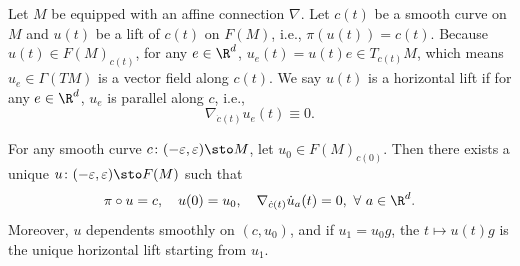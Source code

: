 Let $M$ be equipped with an affine connection $\nabla$. Let $c(t)$ be a smooth curve on $M$ and $u(t)$ be a lift of $c(t)$ on $F(M)$, i.e., $\pi(u(t)) = c(t)$. Because $u(t) \in F(M)_{c(t)}$, for any $e \in \R^d$, $u_e(t) = u(t)e \in T_{c(t)}M$, which means $u_e \in \Gamma(TM)$ is a vector field along $c(t)$. We say $u(t)$ is a horizontal lift if for any $e \in \R^d$, $u_e$ is parallel along $c$, i.e.,
\begin{equation*}
    \nabla_{\dot{c}(t)}u_e(t) \equiv 0.
\end{equation*}

\begin{lem}
    For any smooth curve $c \colon (-\varepsilon,\varepsilon) \sto M$, let $u_0 \in F(M)_{c(0)}$. Then there exists a unique $u \colon (-\varepsilon,\varepsilon) \sto F(M)$ such that
    \begin{equation*}
        \pi \circ u = c,\quad u(0) = u_0,\quad \nabla_{\dot{c}(t)}\dot{u}_a(t) = 0, ~\forall~a \in \R^d.
    \end{equation*}
    Moreover, $u$ dependents smoothly on $(c,u_0)$, and if $u_1 = u_0g$, the $t \mapsto u(t)g$ is the unique horizontal lift starting from $u_1$.
\end{lem}
